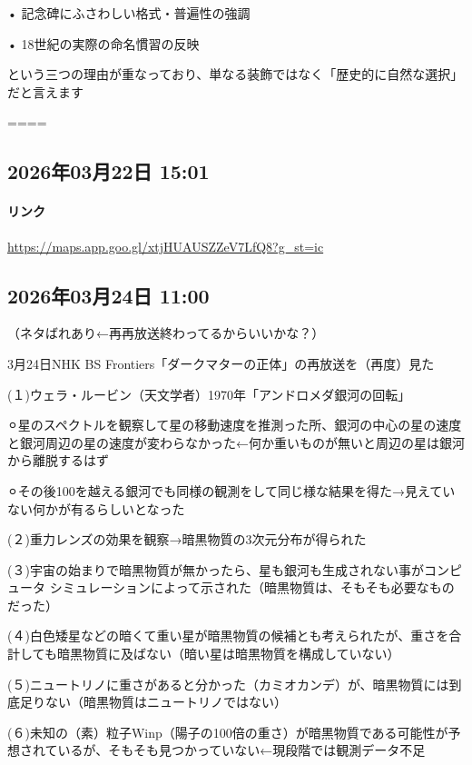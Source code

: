 \documentclass[facebook_diary.tex]{subfiles}
\begin{document}
• 記念碑にふさわしい格式・普遍性の強調

• 18世紀の実際の命名慣習の反映

という三つの理由が重なっており、単なる装飾ではなく「歴史的に自然な選択」だと言えます

====

\subsection*{2026年03月22日 15:01}

\paragraph{リンク}
\url{https://maps.app.goo.gl/xtjHUAUSZZeV7LfQ8?g_st=ic}

\subsection*{2026年03月24日 11:00}

（ネタばれあり←再再放送終わってるからいいかな？）

3月24日NHK BS Frontiers「ダークマターの正体」の再放送を（再度）見た


(１)ウェラ・ルービン（天文学者）1970年「アンドロメダ銀河の回転」

⚪︎星のスペクトルを観察して星の移動速度を推測った所、銀河の中心の星の速度と銀河周辺の星の速度が変わらなかった←何か重いものが無いと周辺の星は銀河から離脱するはず

⚪︎その後100を越える銀河でも同様の観測をして同じ様な結果を得た→見えていない何かが有るらしいとなった


(２)重力レンズの効果を観察→暗黒物質の3次元分布が得られた


(３)宇宙の始まりで暗黒物質が無かったら、星も銀河も生成されない事がコンピュータ シミュレーションによって示された（暗黒物質は、そもそも必要なものだった）


(４)白色矮星などの暗くて重い星が暗黒物質の候補とも考えられたが、重さを合計しても暗黒物質に及ばない（暗い星は暗黒物質を構成していない）


(５)ニュートリノに重さがあると分かった（カミオカンデ）が、暗黒物質には到底足りない（暗黒物質はニュートリノではない）


(６)未知の（素）粒子Winp（陽子の100倍の重さ）が暗黒物質である可能性が予想されているが、そもそも見つかっていない←現段階では観測データ不足
\end{document}
